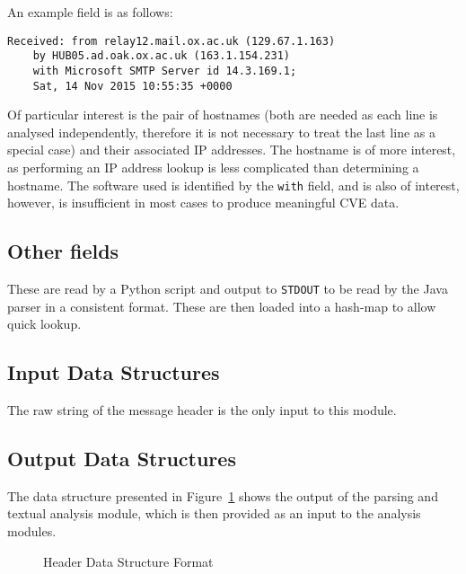 An example field is as follows:
\begin{verbatim}
Received: from relay12.mail.ox.ac.uk (129.67.1.163)
    by HUB05.ad.oak.ox.ac.uk (163.1.154.231)
    with Microsoft SMTP Server id 14.3.169.1;
    Sat, 14 Nov 2015 10:55:35 +0000
\end{verbatim}

Of particular interest is the pair of hostnames (both are needed as each line is analysed independently, therefore it is not necessary to treat the last line as a special case) and their associated IP addresses.  The hostname is of more interest, as performing an IP address lookup is less complicated than determining a hostname.  The software used is identified by the \texttt{with} field, and is also of interest, however, is insufficient in most cases to produce meaningful CVE data.

\subsection{Other fields}

These are read by a Python script and output to \texttt{STDOUT} to be read by
the Java parser in a consistent format.  These are then loaded into a hash-map to
allow quick lookup.


\subsection{Input Data Structures}
The raw string of the message header is the only input to this module.

\subsection{Output Data Structures}
The data structure presented in Figure~\ref{fig:hea} shows the output of the
parsing and textual analysis module, which is then provided as an input to the
analysis modules.

\begin{figure}
\centering
{}
	\caption{Header Data Structure Format}
	\label{fig:hea}
\end{figure}


